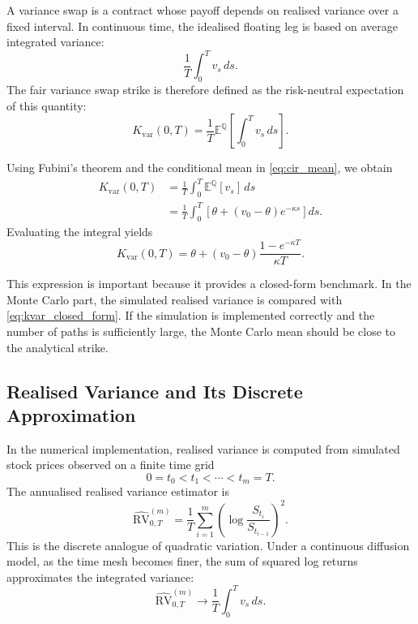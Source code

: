 A variance swap is a contract whose payoff depends on realised variance over a fixed interval. In continuous time, the idealised floating leg is based on average integrated variance:
\begin{equation}
\frac{1}{T}\int_0^T v_s\,ds.
\end{equation}
The fair variance swap strike is therefore defined as the risk-neutral expectation of this quantity:
\begin{equation}
K_{\mathrm{var}}(0,T)
=
\frac{1}{T}
\mathbb{E}^{\mathbb{Q}}
\left[
\int_0^T v_s\,ds
\right].
\label{eq:kvar_definition}
\end{equation}

Using Fubini's theorem and the conditional mean in \eqref{eq:cir_mean}, we obtain
\begin{align}
K_{\mathrm{var}}(0,T)
&=
\frac{1}{T}
\int_0^T
\mathbb{E}^{\mathbb{Q}}[v_s]\,ds \\
&=
\frac{1}{T}
\int_0^T
\left[
\theta+(v_0-\theta)e^{-\kappa s}
\right]ds.
\end{align}
Evaluating the integral yields
\begin{equation}
\boxed{
K_{\mathrm{var}}(0,T)
=
\theta+
(v_0-\theta)
\frac{1-e^{-\kappa T}}{\kappa T}.
}
\label{eq:kvar_closed_form}
\end{equation}

This expression is important because it provides a closed-form benchmark. In the Monte Carlo part, the simulated realised variance is compared with \eqref{eq:kvar_closed_form}. If the simulation is implemented correctly and the number of paths is sufficiently large, the Monte Carlo mean should be close to the analytical strike.

\subsection{Realised Variance and Its Discrete Approximation}

In the numerical implementation, realised variance is computed from simulated stock prices observed on a finite time grid
\[
0=t_0<t_1<\cdots<t_m=T.
\]
The annualised realised variance estimator is
\begin{equation}
\widehat{\mathrm{RV}}_{0,T}^{(m)}
=
\frac{1}{T}
\sum_{i=1}^{m}
\left(
\log\frac{S_{t_i}}{S_{t_{i-1}}}
\right)^2.
\label{eq:rv_discrete}
\end{equation}
This is the discrete analogue of quadratic variation. Under a continuous diffusion model, as the time mesh becomes finer, the sum of squared log returns approximates the integrated variance:
\begin{equation}
\widehat{\mathrm{RV}}_{0,T}^{(m)}
\rightarrow
\frac{1}{T}
\int_0^T v_s\,ds.
\label{eq:rv_limit}
\end{equation}

